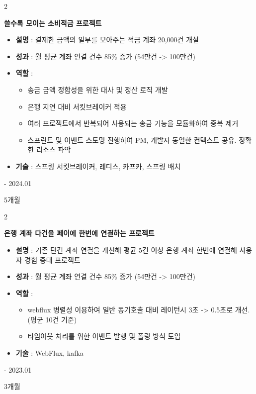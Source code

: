 \documentclass[10pt, letterpaper]{article}
\newenvironment{highlights}{
    \begin{itemize}[
        topsep=0.10 cm,
        parsep=0.10 cm,
        partopsep=0pt,
        itemsep=0pt,
        leftmargin=0.4 cm + 10pt
    ]
    }{
    \end{itemize}
} %
\newenvironment{twocolentry}[2][]{
    \onecolentry
    \def\secondColumn{#2}
    \setcolumnwidth{\fill, 4.5 cm}
    \begin{paracol}{2}
    }{
        \switchcolumn \raggedleft \secondColumn
    \end{paracol}
    \endonecolentry
} %
\begin{document}
    \vspace{0.2 cm}

    \begin{twocolentry}{
        2023.07 - 2024.01

        5개월
    }
        \textbf{쓸수록 모이는 소비적금 프로젝트}
        \begin{highlights}

            \item \textbf{설명} : 결제한 금액의 일부를 모아주는 적금 계좌 20,000건 개설
            \item \textbf{성과} : 월 평균 계좌 연결 건수 85\% 증가 (54만건 -> 100만건)
            \item \textbf{역할} :
            \begin{highlights}
                \item 송금 금액 정합성을 위한 대사 및 정산 로직 개발
                \item 은행 지연 대비 서킷브레이커 적용
                \item 여러 프로젝트에서 반복되어 사용되는 송금 기능을 모듈화하여 중복 제거
                \item 스프린트 및 이벤트 스토밍 진행하여 PM, 개발자 동일한 컨텍스트 공유. 정확한 리소스 파악
            \end{highlights}
            \item \textbf{기술} : 스프링 서킷브레이커, 레디스, 카프카, 스프링 배치
        \end{highlights}
    \end{twocolentry}

    \vspace{0.2 cm}

    \begin{twocolentry}{
        2022.10 - 2023.01

        3개월
    }
        \textbf{은행 계좌 다건을 페이에 한번에 연결하는 프로젝트}
        \begin{highlights}

            \item \textbf{설명} : 기존 단건 계좌 연결을 개선해 평균 5건 이상 은행 계좌 한번에 연결해 사용자 경험 증대 프로젝트
            \item \textbf{성과} : 월 평균 계좌 연결 건수 85\% 증가 (54만건 -> 100만건)
            \item \textbf{역할} :
            \begin{highlights}
                \item webflux 병렬성 이용하여 일반 동기호출 대비 레이턴시 3초 -> 0.5초로 개선. (평균 10건 기준)
                \item 타임아웃 처리를 위한 이벤트 발행 및 폴링 방식 도입
            \end{highlights}
            \item \textbf{기술} : WebFlux, kafka
        \end{highlights}
    \end{twocolentry}
\end{document}
